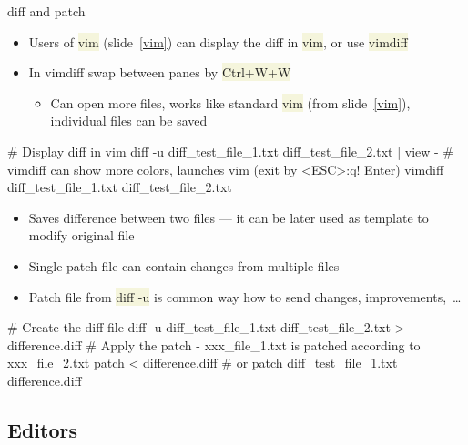 \documentclass[compress, xelatex, 11pt, xcolor=svgnames, aspectratio=169,
	hyperref={
		bookmarks=true,
		unicode=true,
		colorlinks=true,
		pdftitle={Linux, command line and MetaCentrum},
		plainpages=false,
		pdfauthor={Vojtech Zeisek},
		pdfsubject={Course about use of Linux command line, writing shell scripts and using MetaCentrum of CESNET},
		pdfcreator={XeLaTeX},
		pdfkeywords={Linux, GNU, BASH, shell, command line, MetaCentrum},
		linkcolor=DarkRed, %
		anchorcolor=DarkBlue, %
		citecolor=Indigo, %
		filecolor=NavyBlue, %
		menucolor=DarkMagenta, %
		urlcolor=DarkBlue, %
		},
	url={hyphens, lowtilde} %
	]{beamer}
\renewcommand{\texttt}[1]{\colorbox{Beige}{{\ttfamily #1}}}
\begin{document}
\begin{frame}[fragile]{diff and patch}
	\begin{itemize}
		\item Users of \texttt{vim} (slide~\ref{vim}) can display the diff in \texttt{vim}, or use \texttt{vimdiff}
		\item In vimdiff swap between panes by \texttt{Ctrl+W+W}
		\begin{itemize}
			\item Can open more files, works like standard \texttt{vim} (from slide~\ref{vim}), individual files can be saved
		\end{itemize}
	\end{itemize}
	\vfill
	\begin{bashcode}
    # Display diff in vim
    diff -u diff_test_file_1.txt diff_test_file_2.txt | view -
    # vimdiff can show more colors, launches vim (exit by <ESC>:q! Enter)
    vimdiff diff_test_file_1.txt diff_test_file_2.txt
	\end{bashcode}
	\vfill
	\begin{itemize}
		\item Saves difference between two files --- it can be later used as template to modify original file
		\item Single patch file can contain changes from multiple files
		\item Patch file from \texttt{diff -u} is common way how to send changes, improvements,~\ldots
	\end{itemize}
	\vfill
	\begin{bashcode}
    # Create the diff file
    diff -u diff_test_file_1.txt diff_test_file_2.txt > difference.diff
    # Apply the patch - xxx_file_1.txt is patched according to xxx_file_2.txt
    patch < difference.diff # or
    patch diff_test_file_1.txt difference.diff
	\end{bashcode}
\end{frame}

\subsection{Editors}
\end{document}
